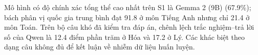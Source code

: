 Mô hình có độ chính xác tổng thể cao nhất trên S1 là Gemma 2 (9B) (67.9\%); bách phân vị quốc gia trung bình đạt 91.8 ở môn Tiếng Anh nhưng chỉ 21.4 ở môn Toán. Trên bộ câu khó đã kiểm tra đáp án, chênh lệch trắc nghiệm--trả lời số của Qwen là 12.4 điểm phần trăm ở Hóa và 17.2 ở Lý. Các khác biệt theo dạng câu không đủ để kết luận về nhiễm dữ liệu huấn luyện.

